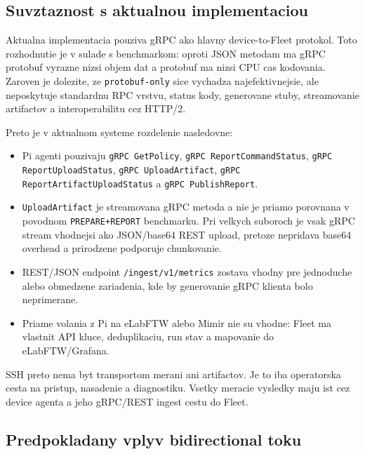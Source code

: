 \documentclass[12pt,a4paper]{report}
\begin{document}
\subsection{Suvztaznost s aktualnou implementaciou}

Aktualna implementacia pouziva gRPC ako hlavny device-to-Fleet protokol.
Toto rozhodnutie je v sulade s benchmarkom: oproti JSON metodam ma gRPC
protobuf vyrazne nizsi objem dat a protobuf ma nizsi CPU cas kodovania.
Zaroven je dolezite, ze \texttt{protobuf-only} sice vychadza najefektivnejsie,
ale neposkytuje standardnu RPC vrstvu, status kody, generovane stuby,
streamovanie artifactov a interoperabilitu cez HTTP/2.

Preto je v aktualnom systeme rozdelenie nasledovne:
\begin{itemize}
  \item Pi agenti pouzivaju \texttt{gRPC GetPolicy},
  \texttt{gRPC ReportCommandStatus}, \texttt{gRPC ReportUploadStatus},
  \texttt{gRPC UploadArtifact}, \texttt{gRPC ReportArtifactUploadStatus}
  a \texttt{gRPC PublishReport}.
  \item \texttt{UploadArtifact} je streamovana gRPC metoda a nie je priamo
  porovnana v povodnom \texttt{PREPARE+REPORT} benchmarku. Pri velkych
  suboroch je vsak gRPC stream vhodnejsi ako JSON/base64 REST upload,
  pretoze nepridava base64 overhead a prirodzene podporuje chunkovanie.
  \item REST/JSON endpoint \texttt{/ingest/v1/metrics} zostava vhodny pre
  jednoduche alebo obmedzene zariadenia, kde by generovanie gRPC klienta
  bolo neprimerane.
  \item Priame volania z Pi na eLabFTW alebo Mimir nie su vhodne: Fleet ma
  vlastnit API kluce, deduplikaciu, run stav a mapovanie do eLabFTW/Grafana.
\end{itemize}

SSH preto nema byt transportom merani ani artifactov. Je to iba operatorska
cesta na pristup, nasadenie a diagnostiku. Vsetky meracie vysledky maju ist
cez device agenta a jeho gRPC/REST ingest cestu do Fleet.

\subsection{Predpokladany vplyv bidirectional toku}
\end{document}
